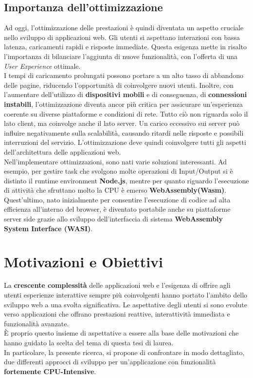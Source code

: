 \subsection{Importanza dell'ottimizzazione}
Ad oggi, l'ottimizzazione delle prestazioni è quindi diventata un aspetto cruciale nello sviluppo di applicazioni web.
Gli utenti si aspettano interazioni con bassa latenza, caricamenti rapidi e risposte immediate.
Questa esigenza mette in risalto l'importanza di bilanciare l'aggiunta di nuove funzionalità, con l'offerta di una \emph{User Experience} ottimale.
\\I tempi di caricamento prolungati possono portare a un alto tasso di abbandono delle pagine, riducendo l'opportunità di coinvolgere nuovi utenti.
Inoltre, con l'aumentare dell'utilizzo di \textbf{dispositivi mobili} e di conseguenza, di \textbf{connessioni instabili}, l'ottimizzazione diventa ancor più critica per assicurare un'esperienza coerente su diverse piattaforme e condizioni di rete.
Tutto ciò non riguarda solo il lato client, ma coinvolge anche il lato server. 
Un carico eccessivo sui server può influire negativamente sulla scalabilità, causando ritardi nelle risposte e possibili interruzioni del servizio.
L'ottimizzazione deve quindi coinvolgere tutti gli aspetti dell'architettura delle applicazioni web.
\\Nell'implementare ottimizzazioni, sono nati varie soluzioni interessanti. 
Ad esempio, per gestire task che svolgono molte operazioni di Input/Output si è distinto il runtime environment \textbf{Node.js}\cite*{nodeHome}, mentre per quanto riguardo l'esecuzione di attività che sfruttano molto la CPU è emerso \textbf{WebAssembly(Wasm)}\cite*{wasmHome}.
Quest'ultimo, nato inizialmente per consentire l'esecuzione di codice ad alta efficienza all'interno del browser, è diventato portabile anche su piattaforme server side grazie allo sviluppo dell'interfaccia di sistema \textbf{WebAssembly System Interface (WASI)}\cite*{wasiHome}.


\section{Motivazioni e Obiettivi}
\label{sec:Obiettivi}
La \textbf{crescente complessità} delle applicazioni web e l'esigenza di offrire agli utenti esperienze interattive sempre più coinvolgenti hanno portato l'ambito dello sviluppo web a una svolta significativa.
Le aspettative degli utenti si sono evolute verso applicazioni che offrano prestazioni reattive, interattività immediata e funzionalità avanzate.
\\È proprio questo insieme di aspettative a essere alla base delle motivazioni che hanno guidato la scelta del tema di questa tesi di laurea.
\\In particolare, la presente ricerca, si propone di confrontare in modo dettagliato, due differenti approcci di sviluppo per un'applicazione con funzionalità \textbf{fortemente CPU-Intensive}.
